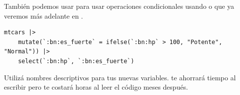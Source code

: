\documentclass[8pt]{beamer}
\begin{document}
\begin{frame}[fragile]
	También podemos usar  para usar operaciones condicionales usando  o  que ya veremos m\'as adelante en  .
\begin{lstlisting}[style=RScript]
mtcars |> 
	mutate(`:bn:es_fuerte` = ifelse(`:bn:hp` > 100, "Potente", "Normal")) |> 
	select(`:bn:hp`, `:bn:es_fuerte`)	
\end{lstlisting}

\begin{alertblock}{}
	Utiliz\'a nombres descriptivos para tus nuevas variables.  te ahorrará tiempo al escribir pero te costará horas al leer el código meses después.
\end{alertblock}
\end{frame}
\end{document}
